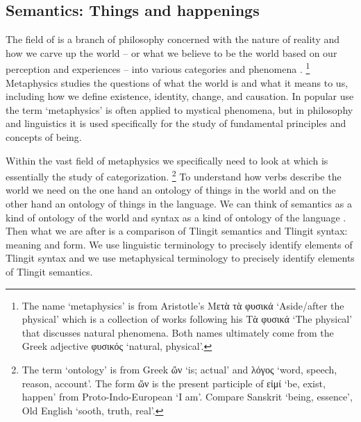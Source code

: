 






\subsection{Semantics: Things and happenings}\label{sec:intro-ling-sem}


The field of  is a branch of philosophy concerned with the nature of reality and how we carve up the world – or what we believe to be the world based on our perception and experiences – into various  categories and phenomena \parencite{van-inwagen-sullivan:2015}.%
\footnote{The name ‘metaphysics’ is from Aristotle’s Μετὰ τὰ φυσικά  ‘Aside/after the physical’ which is a collection of works following his Τὰ φυσικά  ‘The physical’ that discusses natural phenomena. Both names ultimately come from the Greek adjective φυσικός  ‘natural, physical’.}
Metaphysics studies the questions of what the world is and what it means to us, including how we define existence, identity, change, and causation.
In popular use the term ‘metaphysics’ is often applied to mystical phenomena, but in philosophy and linguistics it is used specifically for the study of fundamental principles and concepts of being.

Within the vast field of metaphysics we specifically need to look at  which is essentially the study of categorization.%
\footnote{The term ‘ontology’ is from Greek ὤν  ‘is; actual’ and λόγος  ‘word, speech, reason, account’. The form ὤν  is the present participle of εἰμί  ‘be, exist, happen’ from Proto-Indo-European  ‘I am’. Compare Sanskrit  ‘being, essence’, Old English  ‘sooth, truth, real’.}
To understand how verbs describe the world we need on the one hand an ontology of things in the world and on the other hand an ontology of things in the language.
We can think of semantics as a kind of ontology of the world and syntax as a kind of ontology of the language  \parencites{montague:1969}.
Then what we are after is a comparison of Tlingit semantics and Tlingit syntax: meaning and form.
We use linguistic terminology to precisely identify elements of Tlingit syntax and we use metaphysical terminology to precisely identify elements of Tlingit semantics.

